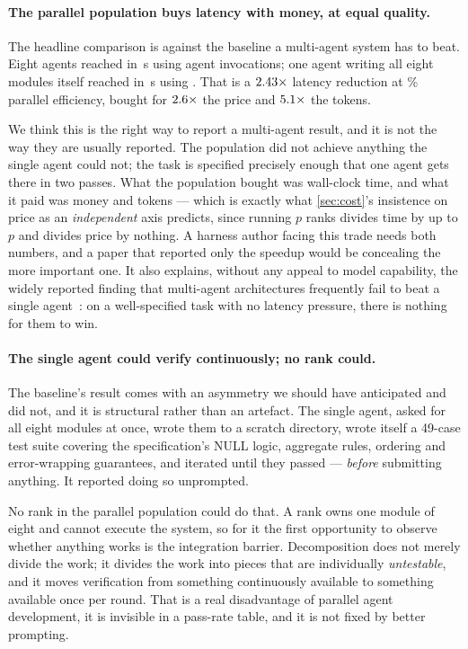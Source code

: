 \documentclass[10pt,twocolumn]{article}
\theoremstyle{definition}
\theoremstyle{plain}
\begin{document}
\paragraph{The parallel population buys latency with money, at equal quality.} The
headline comparison is against the baseline a multi-agent system has to beat. Eight
agents reached \NSwParPassed{} in \NSwParWall\,s using \NSwParCalls{} agent
invocations; one agent writing all eight modules itself reached \NSwSoloPassed{} in
\NSwSoloWall\,s using \NSwSoloCalls. That is a $2.43\times$ latency reduction
at \NSwEff\% parallel efficiency, bought for $2.6\times$ the price and
$5.1\times$ the tokens.

We think this is the right way to report a multi-agent result, and it is not the way
they are usually reported. The population did not achieve anything the single agent
could not; the task is specified precisely enough that one agent gets there in two
passes. What the population bought was wall-clock time, and what it paid was money and
tokens --- which is exactly what \cref{sec:cost}'s insistence on price as an
\emph{independent} axis predicts, since running $p$ ranks divides time by up to $p$ and
divides price by nothing. A harness author facing this trade needs both numbers, and a
paper that reported only the speedup would be concealing the more important one. It
also explains, without any appeal to model capability, the widely reported finding that
multi-agent architectures frequently fail to beat a single
agent~\cite{cognitiondont,lmteams26}: on a well-specified task with no latency
pressure, there is nothing for them to win.

\paragraph{The single agent could verify continuously; no rank could.} The baseline's
result comes with an asymmetry we should have anticipated and did not, and it is
structural rather than an artefact. The single agent, asked for all eight modules at
once, wrote them to a scratch directory, wrote itself a 49-case test suite covering the
specification's NULL logic, aggregate rules, ordering and error-wrapping guarantees, and
iterated until they passed --- \emph{before} submitting anything. It reported doing so
unprompted.

No rank in the parallel population could do that. A rank owns one module of eight and
cannot execute the system, so for it the first opportunity to observe whether anything
works is the integration barrier. Decomposition does not merely divide the work; it
divides the work into pieces that are individually \emph{untestable}, and it moves
verification from something continuously available to something available once per
round. That is a real disadvantage of parallel agent development, it is invisible in a
pass-rate table, and it is not fixed by better prompting.
\end{document}
